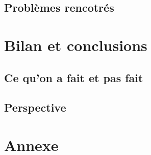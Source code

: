 \documentclass[oneside,13pt,a4paper]{report}
\begin{document}
\section{Problèmes rencotrés}

\chapter{Bilan et conclusions}

\section{Ce qu'on a fait et pas fait}

\section{Perspective}



\appendix
\chapter{Annexe}
\end{document}
